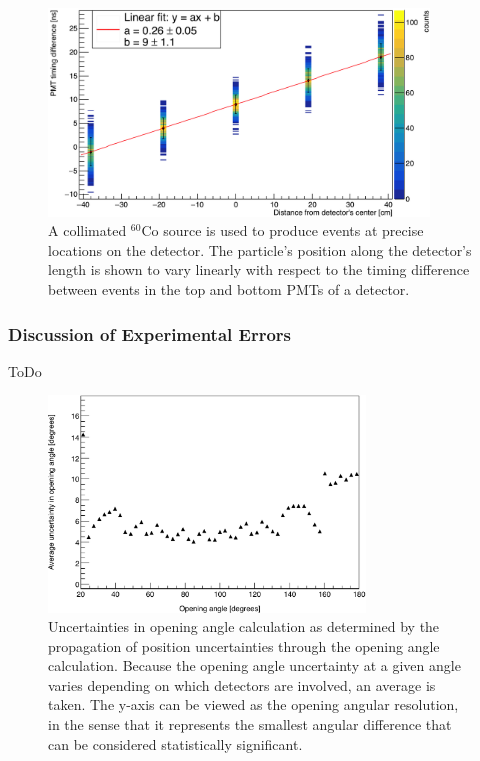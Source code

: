 \begin{figure}
    \centering
    \includegraphics[width = 0.9\textwidth]{Content/Methods/PMTDifference.png}
    \caption{A collimated $^{60}$Co source is used to produce events at precise locations on the detector.
    The particle's position along the detector's length is shown to vary linearly with respect to the timing difference between events in the top and bottom PMTs of a detector.}
    \label{fig:PMTDifference}
\end{figure}
\subsubsection{Discussion of Experimental Errors}
\label{Errors}
ToDo
\begin{figure}[h]
    \centering
    \includegraphics[width = 0.75\textwidth]{Content/Methods/OpeningAngleUncertainty.png}
    \caption{Uncertainties in opening angle calculation as determined by the propagation of position uncertainties through the  opening angle calculation.
    Because the opening angle uncertainty at a given angle varies depending on which detectors are involved, an average is taken.
    The y-axis can be viewed as the opening angular resolution, in the sense that it represents the smallest angular difference that can be considered statistically significant.
    }
    \label{fig:CrossTalkExamplepng}
\end{figure}


